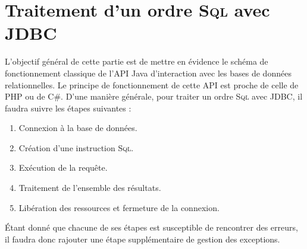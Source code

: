 \documentclass{article}
\begin{document}
\begin{figure}
    \hfill%
    \caption{}
\end{figure}

\section{Traitement d'un ordre \textsc{Sql} avec JDBC}
L'objectif général de cette partie est de mettre en évidence le schéma de fonctionnement classique de l'API Java d'interaction avec les bases de données relationnelles. Le principe de fonctionnement de cette API est proche de celle de PHP ou de C\#. D'une manière générale, pour traiter un ordre \textsc{Sql} avec JDBC, il faudra suivre les étapes suivantes :

\begin{enumerate}
  \item Connexion à la base de données.
  \item Création d'une instruction \textsc{Sql}.
  \item Exécution de la requête.
  \item Traitement de l'ensemble des résultats.
  \item Libération des ressources et fermeture de la connexion.
\end{enumerate}
Étant donné que chacune de ses étapes est susceptible de rencontrer des erreurs, il faudra donc rajouter une étape supplémentaire de gestion des exceptions. 
\end{document}
